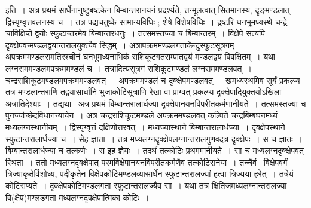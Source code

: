 \documentclass[11pt, openany]{book}
\begin{document}
\noindent इति~। अत्र प्रथमं सार्धेनानुष्टुबष्टकेन बिम्बान्तरानयनं प्रदर्श्यते, तन्मूलत्वात् सितमानस्य, दृङ्मण्डलात् द्विस्पृग्वृत्तवलनस्य च~। तत्र पद्यचतुष्के सामान्यविधिः ; शेषे विशेषविधिः~। द्रष्टरि घनभूमध्यस्थे चन्द्रे चाविक्षिप्ते द्वयोः स्फुटान्तरमेव बिम्बान्तरधनुः~। तत्समस्तज्या च
बिम्बान्तरम्~। विक्षेपे सत्यपि दृक्क्षेपवन्मण्डलद्वयान्तरालयुक्त्यैव सिद्धम्~। अत्रापक्रममण्डलगतार्केन्दुस्फुटसूत्रगम् अपक्रममण्डलसमतिरश्चीनं
घनभूमध्यनाभिकं राशिकूटगतसम्पातद्वयं मण्डलद्वयं विवक्षितम्~। यथा लग्नसममण्डलमपक्रममण्डलं च~। तत्रादित्यसूत्रगं राशिकूटमण्डलं लग्नसममण्डलवत्~। चन्द्रराशिकूटमण्डलमपक्रममण्डलवत्~। अपक्रममण्डलं च दृक्क्षेपमण्डलवत्~। खमध्यस्थमिव सूर्यं प्रकल्प्य तत्र मण्डलान्तराणि तद्व्यासार्धानि भुजाकोटिसूत्राणि रेखा वा प्राग्वत् प्रकल्प्य दृक्क्षेपादियुक्तयोऽखिला अत्रातिदेश्याः~। तद्यथा \textendash\ अत्र प्रथमं बिम्बान्तरालार्धज्या दृक्क्षेपानयनविपरीतकर्मणानीयते~। तत्समस्तज्या च पुनर्ज्याच्छेदविधानन्यायेन~। अत्र चन्द्रराशिकूटमण्डले अपक्रममण्डलवत् कल्पिते चन्द्रबिम्बघनमध्यं मध्यलग्नस्थानीयम्~। द्विस्पृग्वृत्तं दक्षिणोत्तरवत्~। मध्यज्यास्थाने बिम्बान्तरालार्धज्या~। दृक्क्षेपस्थाने स्फुटान्तरालार्धज्या च~। सेह ज्ञाता~। तत्र मध्यलग्नदृक्क्षेपलग्नान्तरालगुणवदत्र दृक्क्षेपः~। स च ज्ञातः~। बिम्बान्तरालार्धज्या च तत्कर्णः~। स इह ज्ञेयः~। तदर्थं तत्कोटिः प्रथममानीयते~। सा च मध्यलग्नदृक्क्षेपवत् स्थिता~। ततो मध्यलग्नदृक्क्षेपात् परमविक्षेपानयनविपरीतकर्मणैव तत्कोटिरानेया~। तच्चैवं \textendash\ विक्षेपवर्गं त्रिज्याकृतेर्विशोध्य, पदीकृतेन विक्षेपकोटिमण्डलव्यासार्धेन स्फुटान्तरालज्यां हत्वा त्रिज्यया हरेत्~। तत्रेयं
कोटिराप्यते~। दृक्क्षेपकोटिमण्डलगता स्फुटान्तरालज्यैव सा~। यथा तत्र क्षितिजमध्यलग्नान्तरालज्या वि(क्षेप)मण्लडगता मध्यलग्नदृक्क्षेपात्मिका कोटिः~।

\newpage
\end{document}
